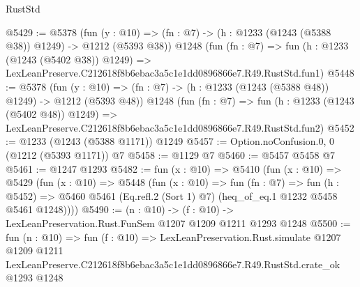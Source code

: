 \begin{lexlean}{RustStd}
\begin{coremodule}
@5429 := @5378
    (fun (y : @10) => (fn : @7) -> (h : @1233 (@1243 (@5388 @38)) @1249) -> @1212 (@5393 @38))
    @1248
    (fun (fn : @7) =>
    fun (h : @1233 (@1243 (@5402 @38)) @1249) =>
    LexLeanPreserve.C212618f8b6ebac3a5c1e1dd0896866e7.R49.RustStd.fun1)
@5448 := @5378
    (fun (y : @10) => (fn : @7) -> (h : @1233 (@1243 (@5388 @48)) @1249) -> @1212 (@5393 @48))
    @1248
    (fun (fn : @7) =>
    fun (h : @1233 (@1243 (@5402 @48)) @1249) =>
    LexLeanPreserve.C212618f8b6ebac3a5c1e1dd0896866e7.R49.RustStd.fun2)
@5452 := @1233 (@1243 (@5388 @1171)) @1249
@5457 := Option.noConfusion.{0, 0} (@1212 (@5393 @1171)) @7
@5458 := @1129 @7
@5460 := @5457 @5458 @7
@5461 := @1247 @1293
@5482 := fun (x : @10) =>
  @5410
    (fun (x : @10) =>
    @5429
      (fun (x : @10) =>
      @5448
        (fun (x : @10) =>
        fun (fn : @7) =>
        fun (h : @5452) =>
        @5460 @5461 (Eq.refl.{2} (Sort 1) @7) (heq_of_eq.{1} @1232 @5458 @5461 @1248))))
@5490 := (n : @10) -> (f : @10) -> LexLeanPreservation.Rust.FunSem @1207 @1209 @1211 @1293 @1248
@5500 := fun (n : @10) =>
  fun (f : @10) =>
  LexLeanPreservation.Rust.simulate
    @1207
    @1209
    @1211
    LexLeanPreserve.C212618f8b6ebac3a5c1e1dd0896866e7.R49.RustStd.crate_ok
    @1293
    @1248
\end{coremodule}
\end{lexlean}
